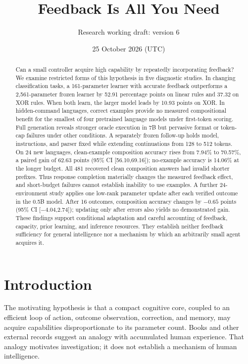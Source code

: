 \documentclass[11pt]{article}
\title{Feedback Is All You Need}
\author{Research working draft: version 6}
\date{25 October 2026 (UTC)}
\begin{document}
\maketitle
\begin{abstract}
Can a small controller acquire high capability by repeatedly incorporating
feedback? We examine restricted forms of this hypothesis in five diagnostic
studies. In changing classification tasks, a 161-parameter learner with
accurate feedback outperforms a 2,561-parameter frozen learner by 52.91
percentage points on linear rules and 37.32 on XOR rules. When both learn,
the larger model leads by 10.93 points on XOR. In hidden-command languages,
correct examples provide no measured compositional benefit for the smallest
of four pretrained language models under first-token scoring. Full generation
reveals stronger oracle execution in 7B but pervasive format or token-cap
failures under other conditions. A separately frozen follow-up holds model,
instructions, and parser fixed while extending continuations from 128 to 512
tokens. On 24 new languages, clean-example composition accuracy rises from
7.94\% to 70.57\%, a paired gain of 62.63 points (95\% CI [56.10,69.16]);
no-example accuracy is 14.06\% at the longer budget. All 481 recovered clean
composition answers had invalid shorter prefixes. Thus response completion
materially changes the measured feedback effect, and short-budget failures
cannot establish inability to use examples. A further 24-environment study
applies one low-rank parameter update after each verified outcome in the 0.5B
model. After 16 outcomes, composition accuracy changes by $-0.65$ points
(95\% CI [$-4.04$,2.74]); updating only after errors also yields no demonstrated
gain. These findings support conditional
adaptation and careful accounting of feedback, capacity, prior learning, and
inference resources. They establish neither feedback sufficiency for general
intelligence nor a mechanism by which an arbitrarily small agent acquires it.
\end{abstract}

\section{Introduction}
The motivating hypothesis is that a compact cognitive core, coupled to an
efficient loop of action, outcome observation, correction, and memory, may
acquire capabilities disproportionate to its parameter count. Books and other
external records suggest an analogy with accumulated human experience. That
analogy motivates investigation; it does not establish a mechanism of human
intelligence.
\end{document}
